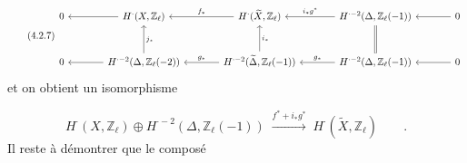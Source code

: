 \begin{equation}\tag{4.2.7}
\begin{tikzcd}[column sep=large, row sep=large]
0 & H^{\cdot}(X,\mathbb{Z}_\ell) \arrow[l] & H^{\cdot}(\widetilde{X},\mathbb{Z}_\ell) \arrow[l, "f_*"'] & H^{\cdot-2}(\Delta,\mathbb{Z}_\ell(-1)) \arrow[l, "i_*g^*"'] & 0 \arrow[l] \\
0 & H^{\cdot-2}(\Delta,\mathbb{Z}_\ell(-2)) \arrow[l] \arrow[u, "j_*"'] & H^{\cdot-2}(\widetilde{\Delta},\mathbb{Z}_\ell(-1)) \arrow[l, "g_*"'] \arrow[u, "i_*"'] & H^{\cdot-2}(\Delta,\mathbb{Z}_\ell(-1)) \arrow[l, "g_*"'] \arrow[u, equal] & 0 \arrow[l]
\end{tikzcd}
\end{equation}
et on obtient un isomorphisme

\begin{equation}\tag{4.2.8}
H^{\cdot}(X,\mathbb{Z}_\ell) \oplus H^{\cdot-2}(\Delta,\mathbb{Z}_\ell(-1)) \;\stackrel{f^*+i_*g^*}{\longrightarrow}\; H^{\cdot}(\widetilde{X},\mathbb{Z}_\ell) \qquad .
\end{equation}
Il reste à démontrer que le composé

